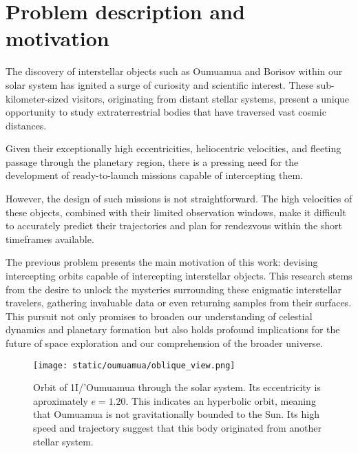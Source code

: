 \section{Problem description and motivation}

The discovery of interstellar objects such as Oumuamua and Borisov within our
solar system has ignited a surge of curiosity and scientific interest. These
sub-kilometer-sized visitors, originating from distant stellar systems, present
a unique opportunity to study extraterrestrial bodies that have traversed vast
cosmic distances. 

Given their exceptionally high eccentricities, heliocentric velocities, and
fleeting passage through the planetary region, there is a pressing need for the
development of ready-to-launch missions capable of intercepting them.

However, the design of such missions is not straightforward. The high velocities
of these objects, combined with their limited observation windows, make it
difficult to accurately predict their trajectories and plan for rendezvous
within the short timeframes available.

The previous problem presents the main motivation of this work: devising
intercepting orbits capable of intercepting interstellar objects. This research
stems from the desire to unlock the mysteries surrounding these enigmatic
interstellar travelers, gathering invaluable data or even returning samples from
their surfaces. This pursuit not only promises to broaden our understanding of
celestial dynamics and planetary formation but also holds profound implications
for the future of space exploration and our comprehension of the broader
universe.

\begin{figure}[H]
  \centering
  \texttt{[image: static/oumuamua/oblique\_view.png]}
  \caption[Oumuamua orbit through our solar system]{
    Orbit of 1I/'Oumuamua through the solar system. Its eccentricity is
    aproximately $e = 1.20$. This indicates an hyperbolic orbit, meaning that
    Oumuamua is not gravitationally bounded to the Sun. Its high speed and
    trajectory suggest that this body originated from another stellar system.
  }
  \label{fig:oumuamua_orbit}
\end{figure}
